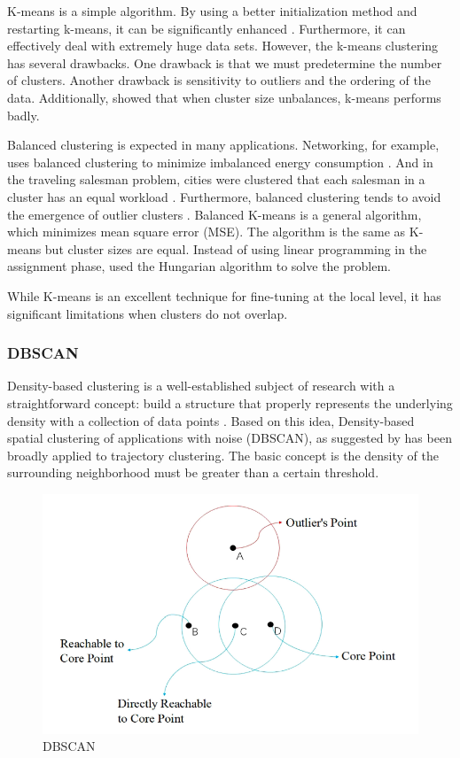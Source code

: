 \documentclass[a4paper, 12pt]{article}
\begin{document}
K-means is a simple algorithm. By using a better initialization method and restarting k-means, it can be significantly enhanced \citep{franti2019much}. Furthermore, it can effectively deal with extremely huge data sets.  However, the k-means clustering has several drawbacks. One drawback is that we must predetermine the number of clusters. Another drawback is sensitivity to outliers and the ordering of the data. Additionally, \citep{franti2018k} showed that when cluster size unbalances, k-means performs badly. 

Balanced clustering is expected in many applications. Networking, for example, uses balanced clustering to minimize imbalanced energy consumption \citep{siavoshi2016load}. And in the traveling salesman problem, cities were clustered that each salesman in a cluster has an equal workload \citep{nallusamy2010optimization}. Furthermore, balanced clustering tends to avoid the emergence of outlier clusters \citep{zhong2003model}. Balanced K-means \citep{malinen2014balanced} is a general algorithm, which minimizes mean square error (MSE). The algorithm is the same as K-means but cluster sizes are equal. Instead of using linear programming in the assignment phase, \citet{malinen2014balanced} used the Hungarian algorithm \citep{burkard2012assignment} to solve the problem.

While K-means is an excellent technique for fine-tuning at the local level, it has significant limitations when clusters do not overlap.

\subsubsection{DBSCAN}
Density-based clustering is a well-established subject of research with a straightforward concept: build a structure that properly represents the underlying density with a collection of data points \citep{kriegel2011density}. Based on this idea, Density-based spatial clustering of applications with noise (DBSCAN), as suggested by \cite{ester1996density} has been broadly applied to trajectory clustering. The basic concept is the density of the surrounding neighborhood must be greater than a certain threshold. 

\begin{figure}[ht]
    \centering
    \includegraphics[width=1\textwidth]{DBSCAN.png}
    \caption{DBSCAN \citep{su2020survey}}
\end{figure}
\end{document}
